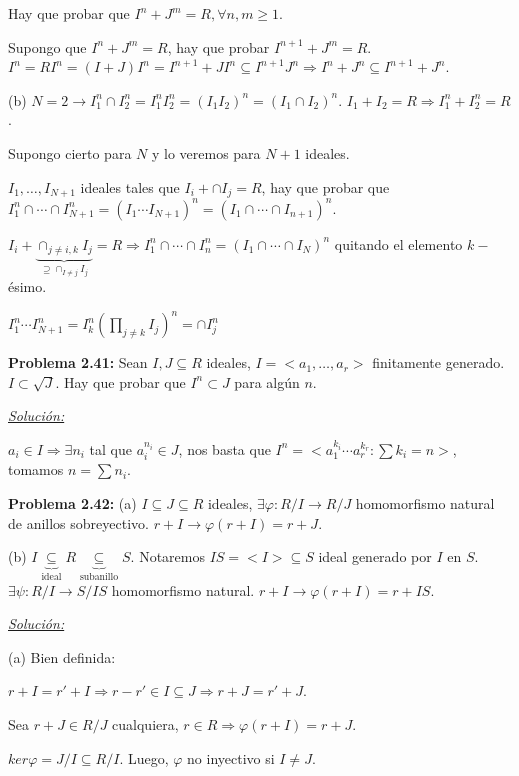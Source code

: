 Hay que probar que $I^n+J^m=R, \forall n,m \ge 1$.

Supongo que $I^n+J^m=R$, hay que probar $I^{n+1}+J^{m}=R$.
$I^n=RI^n=(I+J)I^n=I^{n+1}+JI^n \subseteq I^{n+1}J^n \Rightarrow I^n+J^n\subseteq I^{n+1}+J^n$.

(b) $N=2 \rightarrow I_1^n \cap I_2^n=I_1^nI_2^n=(I_1I_2)^n=(I_1\cap I_2)^n$. $I_1+I_2=R \Rightarrow I_1^n+I_2^n =R$.


Supongo cierto para $N$ y lo veremos para $N+1$ ideales. 

$I_1,\dots ,I_{N+1}$ ideales tales que $I_i+\cap I_j = R$, hay que probar que $I_1^n\cap \cdots \cap I_{N+1}^n = (I_1\cdots I_{N+1})^n = (I_1\cap \cdots \cap I_{n+1})^n$.

$I_i+\underbrace{\cap_{j\neq i,k}I_j}_{ \supseteq \cap_{I\neq j}I_j} = R \Rightarrow I_1^n \cap \cdots \cap I_n^n= (I_1\cap \cdots \cap I_N)^n$ quitando el elemento $k-$ésimo. 

$I_1^n \cdots I_{N+1}^n=I_k^n(\prod_{j\neq k}I_j)^n = \cap I_j^n$

\textbf{Problema 2.41:} Sean $I,J\subseteq R$ ideales, $I=<a_1,\dots,a_r>$ finitamente generado. $I\subset \sqrt{J}$. Hay que probar que $I^n\subset J$ para algún $n$. 

\underline{\textit{Solución: }}

$a_i \in I \Rightarrow \exists n_i$ tal que $a_i^{n_i}\in J$, nos basta que $I^n=<a_1^{k_i}\cdots a_r^{k_r}: \sum k_i = n >$, tomamos $n=\sum n_i$. 

\textbf{Problema 2.42:} (a) $I\subseteq J \subseteq R$ ideales, $\exists \varphi : R/I \rightarrow R/J$ homomorfismo natural de anillos sobreyectivo.  $r+I \rightarrow \varphi(r+I)=r+J$.

(b) $I \underbrace{\subseteq}_{\text{ideal}} R \underbrace{\subseteq}_{\text{subanillo}} S$. Notaremos $IS=<I> \subseteq S$ ideal generado por $I$ en $S$. $\exists \psi : R/I\rightarrow S/IS$ homomorfismo natural.  $r+I \rightarrow \varphi(r+I)=r+IS$.

\underline{\textit{Solución: }}

(a)
Bien definida:


$r+I=r'+I\Rightarrow r-r'\in I\subseteq J \Rightarrow r+J =r'+J$. 

Sea $r+J\in R/J$ cualquiera, $r\in R \Rightarrow \varphi(r+I)=r+J$. 

\begin{nota}
$ker\varphi = J/I \subseteq R/I$. Luego, $\varphi$ no inyectivo si $I\neq J$. 
\end{nota}

